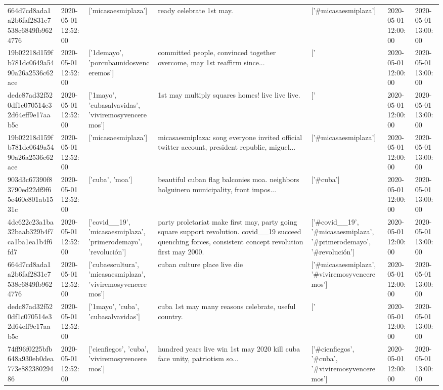 \begin{tabular}{lllllll}
664d7cd8ada1a2b6faf2831e7538c6849fb9624776 & 2020-05-01 12:52:00 & ['micasaesmiplaza'] & ready celebrate 1st may. & ['#micasaesmiplaza'] & 2020-05-01 12:00:00 & 2020-05-01 13:00:00 \\
19b02218d159fb781dc0649a5490a26a2536c62ace & 2020-05-01 12:52:00 & ['1demayo', 'porcubaunidosvenceremos'] & committed people, convinced together overcome, may 1st reaffirm since... & ['#1demayo', '#porcubaunidosvenceremos'] & 2020-05-01 12:00:00 & 2020-05-01 13:00:00 \\
dedc87ad32f520df1c070514e32d64eff9e17aab5c & 2020-05-01 12:52:00 & ['1mayo', 'cubasalvavidas', 'viviremosyvenceremos'] & 1st may multiply squares homes! live live live. & ['#1mayo', '#cubasalvavidas', '#viviremosyvenceremos'] & 2020-05-01 12:00:00 & 2020-05-01 13:00:00 \\
19b02218d159fb781dc0649a5490a26a2536c62ace & 2020-05-01 12:52:00 & ['micasaesmiplaza'] & micasaesmiplaza: song everyone invited official twitter account, president republic, miguel... & ['#micasaesmiplaza'] & 2020-05-01 12:00:00 & 2020-05-01 13:00:00 \\
903d3c67390f83790ed22df9f65e460e801ab1531c & 2020-05-01 12:52:00 & ['cuba', 'moa'] & beautiful cuban flag balconies moa. neighbors holguinero municipality, front impos... & ['#cuba'] & 2020-05-01 12:00:00 & 2020-05-01 13:00:00 \\
4dc622c23a1ba32baab329b4f7ca1ba1ea1b4f6fd7 & 2020-05-01 12:52:00 & ['covid__19', 'micasaesmiplaza', 'primerodemayo', 'revolución'] & party proletariat make first may, party going square support revolution. covid\_\_19 succeed quenching forces, consistent concept revolution first may 2000. & ['#covid__19', '#micasaesmiplaza', '#primerodemayo', '#revolución'] & 2020-05-01 12:00:00 & 2020-05-01 13:00:00 \\
664d7cd8ada1a2b6faf2831e7538c6849fb9624776 & 2020-05-01 12:52:00 & ['cubaescultura', 'micasaesmiplaza', 'viviremosyvenceremos'] & cuban culture place live die & ['#micasaesmiplaza', '#viviremosyvenceremos'] & 2020-05-01 12:00:00 & 2020-05-01 13:00:00 \\
dedc87ad32f520df1c070514e32d64eff9e17aab5c & 2020-05-01 12:52:00 & ['1mayo', 'cuba', 'cubasalvavidas'] & cuba 1st may many reasons celebrate, useful country. & ['#1mayo', '#cuba', '#cubasalvavidas'] & 2020-05-01 12:00:00 & 2020-05-01 13:00:00 \\
74ff96f0225bfb648a930eb0dea773e88238029486 & 2020-05-01 12:52:00 & ['cienfiegos', 'cuba', 'viviremosyvenceremos'] & hundred years live win 1st may 2020 kill cuba face unity, patriotism so... & ['#cienfiegos', '#cuba', '#viviremosyvenceremos'] & 2020-05-01 12:00:00 & 2020-05-01 13:00:00 \\

\end{tabular}

